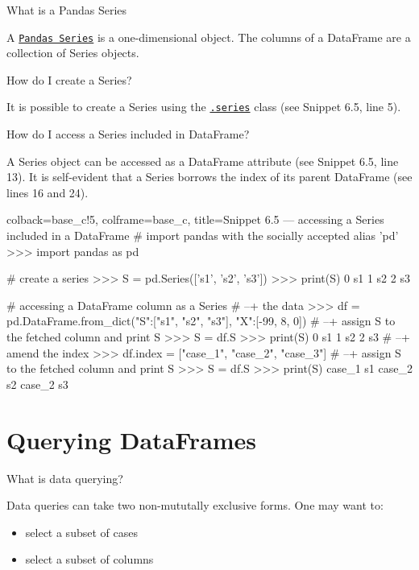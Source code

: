 \documentclass[a4paper,11pt]{book}
\numberwithin{figure}{chapter}
\numberwithin{table}{chapter}
\newcommand{\question}[1]{%
    \begin{tcolorbox}[colback=comp_c!10,colframe=comp_c,sidebyside align=top,width=\linewidth,before skip=1ex]
        #1
    \end{tcolorbox}
    \switchcolumn%
}
\newcommand{\note}[1]{%
    \begin{tcolorbox}[colback=white!0,colframe=white!10,width=\linewidth,before skip=1ex]
        #1
    \end{tcolorbox}
}
\begin{document}
\begin{paracol}{2}
	\question{\raggedright What is a Pandas Series}
	\note{A \href{https://pandas.pydata.org/docs/reference/series.html}{\texttt{Pandas Series}} is a one-dimensional object. The columns of a DataFrame are a collection of Series objects.}
\end{paracol}

\begin{paracol}{2}
	\question{\raggedright How do I create a Series?}
	\note{It is possible to create a Series using the \href{https://pandas.pydata.org/docs/reference/series.html}{\texttt{.series}} class (see Snippet 6.5, line 5).}
\end{paracol}

\begin{paracol}{2}
	\question{\raggedright How do I access a Series included in DataFrame?}
	\note{A Series object can be accessed as a DataFrame attribute (see Snippet 6.5, line 13). It is self-evident that a Series borrows the index of its parent DataFrame (see lines 16 and 24).}
\end{paracol}

\begin{pythoncode}[linenos=True]{colback=base_c!5, colframe=base_c, title=\sffamily Snippet 6.5 --- accessing a Series included in a DataFrame}
# import pandas with the socially accepted alias 'pd'
>>> import pandas as pd

# create a series 
>>> S = pd.Series(['s1', 's2', 's3'])
>>> print(S)
0    s1
1    s2
2    s3

# accessing a DataFrame column as a Series
# --+ the data 
>>> df = pd.DataFrame.from_dict({"S":["s1", "s2", "s3"], "X":[-99, 8, 0]})
# --+ assign S to the fetched column and print S
>>> S = df.S
>>> print(S)
0    s1
1    s2
2    s3
# --+ amend the index
>>> df.index = ["case_1", "case_2", "case_3"]
# --+ assign S to the fetched column and print S
>>> S = df.S
>>> print(S)
case_1    s1
case_2    s2
case_2    s3
\end{pythoncode}
\clearpage

\section{Querying DataFrames}
\label{sec:querying_df}

\begin{paracol}{2}
	\question{\raggedright What is data querying?}
	\note{Data queries can take two non-mututally exclusive forms. One may want to:
	
	\begin{itemize}
		\item select a subset of cases 
		\item select a subset of columns
	\end{itemize}
	}
\end{paracol}
\end{document}

